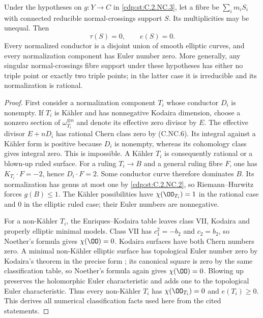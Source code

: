
\begin{proposition}\label{cdp:st:C.2.NC.4}
Under the hypotheses on $g:Y\to C$ in \ref{cdp:st:C.2.NC.3}, let a fibre be $\sum_i m_iS_i$ with connected reducible normal-crossings support $S$. Its multiplicities may be unequal. Then
\[
 \tau(S)=0,\qquad e(S)=0.
 \tag{C.NC.9}\label{cdp:eq:C.NC.9}
\]
Every normalized conductor is a disjoint union of smooth elliptic curves, and every normalization component has Euler number zero. More generally, any singular normal-crossings fibre support under these hypotheses has either no triple point or exactly two triple points; in the latter case it is irreducible and its normalization is rational.
\end{proposition}
\begin{proof}
First consider a normalization component $T_i$ whose conductor $D_i$ is nonempty. If $T_i$ is Kähler and has nonnegative Kodaira dimension, choose a nonzero section of $\omega_{T_i}^{\otimes n}$ and denote its effective zero divisor by $E$. The effective divisor $E+nD_i$ has rational Chern class zero by (C.NC.6). Its integral against a Kähler form is positive because $D_i$ is nonempty, whereas its cohomology class gives integral zero. This is impossible. A Kähler $T_i$ is consequently rational or a blown-up ruled surface. For a ruling $T_i\to B$ and a general ruling fibre $F$, one has $K_{T_i}\cdot F=-2$, hence $D_i\cdot F=2$. Some conductor curve therefore dominates $B$. Its normalization has genus at most one by \ref{cdp:st:C.2.NC.2}, so Riemann--Hurwitz forces $g(B)\le1$. The Kähler possibilities have
$\chi(\OO_{T_i})=1$ in the rational case and $0$ in the elliptic ruled case; their Euler numbers are nonnegative.

For a non-Kähler $T_i$, the Enriques--Kodaira table \cite[Theorem~2.2]{Peters2021} leaves class VII, Kodaira and properly elliptic minimal models. Class VII has $c_1^2=-b_2$ and $c_2=b_2$, so Noether's formula gives $\chi(\OO)=0$. Kodaira surfaces have both Chern numbers zero. A minimal non-Kähler elliptic surface has topological Euler number zero by Kodaira's theorem in the precise form \cite[Theorem~3.2]{BMS2012}; its canonical square is zero by the same classification table, so Noether's formula again gives $\chi(\OO)=0$. Blowing up preserves the holomorphic Euler characteristic and adds one to the topological Euler characteristic. Thus every non-Kähler $T_i$ has $\chi(\OO_{T_i})=0$ and $e(T_i)\ge0$. This derives all numerical classification facts used here from the cited statements.


\end{proof}
